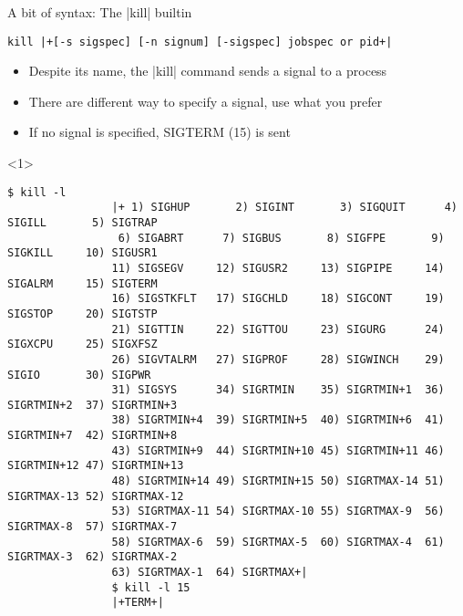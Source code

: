 \begin{frame}[fragile]{A bit of syntax: The \bash|kill| builtin}
    \vspace{-4mm}
    \begin{overlayarea}{\textwidth}{0.7\textheight}
        \begin{lstlisting}[style=MyBash, numbers=none]
            kill |+[-s sigspec] [-n signum] [-sigspec] jobspec or pid+|
        \end{lstlisting}
        \begin{itemize}
            \item Despite its name, the \bash|kill| command sends a signal to a process
            \item There are different way to specify a signal, use what you prefer
            \item If no signal is specified, SIGTERM (15) is sent
        \end{itemize}
        \begin{onlyenv}<1>
            \begin{lstlisting}[style=MyBash, style=smaller, numbers=none, xleftmargin=1mm]
                $ kill -l
                |+ 1) SIGHUP       2) SIGINT       3) SIGQUIT      4) SIGILL       5) SIGTRAP
                 6) SIGABRT      7) SIGBUS       8) SIGFPE       9) SIGKILL     10) SIGUSR1
                11) SIGSEGV     12) SIGUSR2     13) SIGPIPE     14) SIGALRM     15) SIGTERM
                16) SIGSTKFLT   17) SIGCHLD     18) SIGCONT     19) SIGSTOP     20) SIGTSTP
                21) SIGTTIN     22) SIGTTOU     23) SIGURG      24) SIGXCPU     25) SIGXFSZ
                26) SIGVTALRM   27) SIGPROF     28) SIGWINCH    29) SIGIO       30) SIGPWR
                31) SIGSYS      34) SIGRTMIN    35) SIGRTMIN+1  36) SIGRTMIN+2  37) SIGRTMIN+3
                38) SIGRTMIN+4  39) SIGRTMIN+5  40) SIGRTMIN+6  41) SIGRTMIN+7  42) SIGRTMIN+8
                43) SIGRTMIN+9  44) SIGRTMIN+10 45) SIGRTMIN+11 46) SIGRTMIN+12 47) SIGRTMIN+13
                48) SIGRTMIN+14 49) SIGRTMIN+15 50) SIGRTMAX-14 51) SIGRTMAX-13 52) SIGRTMAX-12
                53) SIGRTMAX-11 54) SIGRTMAX-10 55) SIGRTMAX-9  56) SIGRTMAX-8  57) SIGRTMAX-7
                58) SIGRTMAX-6  59) SIGRTMAX-5  60) SIGRTMAX-4  61) SIGRTMAX-3  62) SIGRTMAX-2
                63) SIGRTMAX-1  64) SIGRTMAX+|
                $ kill -l 15
                |+TERM+|
            \end{lstlisting}
        \end{onlyenv}
        \vspace{-2mm}

\end{overlayarea}
\end{frame}
